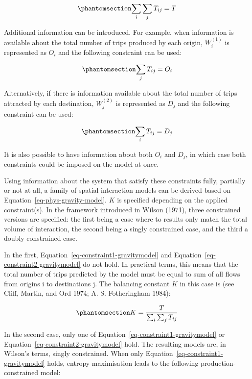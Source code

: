 \documentclass[
]{article}
\begin{document}
\begin{equation}\phantomsection\label{eq-constraint0-gravitymodel}{
\sum_i\sum_j T_{ij} = T
}\end{equation}

Additional information can be introduced. For example, when information
is available about the total number of trips produced by each origin,
\(W_i^{(1)}\) is represented as \(O_i\) and the following constraint can
be used:

\begin{equation}\phantomsection\label{eq-constraint1-gravitymodel}{
\sum_j T_{ij} = O_i
}\end{equation}

Alternatively, if there is information available about the total number
of trips attracted by each destination, \(W_j^{(2)}\) is represented as
\(D_j\) and the following constraint can be used:

\begin{equation}\phantomsection\label{eq-constraint2-gravitymodel}{
\sum_i T_{ij} = D_j
}\end{equation}

It is also possible to have information about both \(O_i\) and \(D_j\),
in which case both constraints could be imposed on the model at once.

Using information about the system that satisfy these constraints fully,
partially or not at all, a family of spatial interaction models can be
derived based on Equation~\ref{eq-phys-gravity-model}. \(K\) is
specified depending on the applied constraint(s). In the framework
introduced in Wilson (1971), three constrained versions are specified:
the first being a case where to results only match the total volume of
interaction, the second being a singly constrained case, and the third a
doubly constrained case.

In the first, Equation~\ref{eq-constraint1-gravitymodel} and
Equation~\ref{eq-constraint2-gravitymodel} do not hold. In practical
terms, this means that the total number of trips predicted by the model
must be equal to sum of all flows from origins i to destinations j. The
balancing constant \(K\) in this case is (see Cliff, Martin, and Ord
1974; A. S. Fotheringham 1984):

\begin{equation}\phantomsection\label{eq-total-flow-balancing-factor}{
K=\frac{T}{\sum_i\sum_j T_{ij}}
}\end{equation}

In the second case, only one of
Equation~\ref{eq-constraint1-gravitymodel} or
Equation~\ref{eq-constraint2-gravitymodel} hold. The resulting models
are, in Wilson's terms, singly constrained. When only
Equation~\ref{eq-constraint1-gravitymodel} holds, entropy maximisation
leads to the following production-constrained model:
\end{document}
